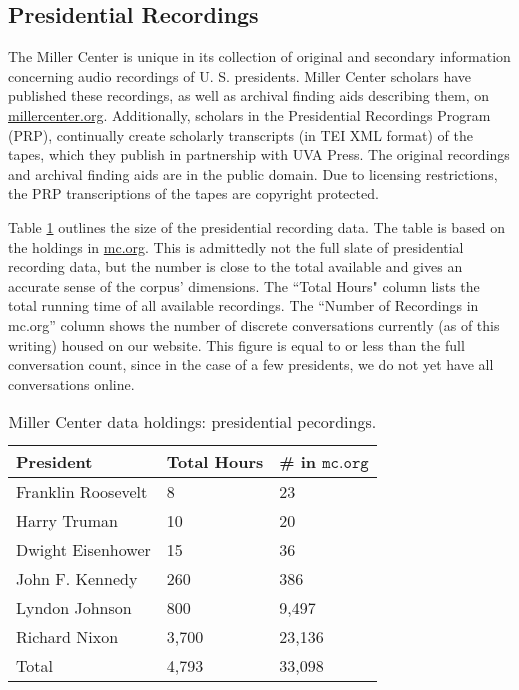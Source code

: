\documentclass[12pt, oneside]{article}   	%
\begin{document}
\subsection{Presidential Recordings}\label{section.data.prp}
The Miller Center is unique in its collection of original and secondary information concerning audio recordings of U. S. presidents.  Miller Center scholars have published these recordings, as well as archival finding aids describing them, on \href{https://millercenter.org}{millercenter.org}.  Additionally, scholars in the Presidential Recordings Program (PRP), continually create scholarly transcripts (in TEI XML format) of the tapes, which they publish in partnership with UVA Press.   The original recordings and archival finding aids are in the public domain.  Due to licensing restrictions, the PRP transcriptions of the tapes are copyright protected.   

Table \ref{table.data.prp} outlines the size of the presidential recording data.  The table is based on the holdings in \href{https://millercenter.org}{mc.org}.  This is admittedly not the full slate of presidential recording data, but the number is close to the total available and gives an accurate sense of the corpus’ dimensions.  The ``Total Hours" column lists the total running time of all available recordings.  The ``Number of Recordings in mc.org” column shows the number of discrete conversations currently (as of this writing) housed on our website.  This figure is equal to or less than the full conversation count, since in the case of a few presidents, we do not yet have all conversations online.  

\begin{table}[htp]
\caption{Miller Center data holdings: presidential pecordings.}
\begin{center}
\begin{tabular}{ p{2in} l l }
\toprule
President				&	Total Hours		&	\#  in $\mathtt{mc.org}$	\\
\midrule
 Franklin Roosevelt 		& 	8 				& 	23 \\ 
 \midrule 
 Harry Truman 			& 	10 				& 	20 \\  
 \midrule
 Dwight Eisenhower	 	& 	15 				& 	36   \\
 \midrule
 John F. Kennedy	 	& 	260 				& 	386   \\
 \hline
 Lyndon Johnson	 	& 	800 				& 	9,497   \\
 \midrule
 Richard Nixon		 	& 	3,700			& 	23,136   \\
\bottomrule
Total					&	4,793			&	33,098	\\
\bottomrule
\end{tabular}
\end{center}
\label{table.data.prp}
\end{table}%
\end{document}
